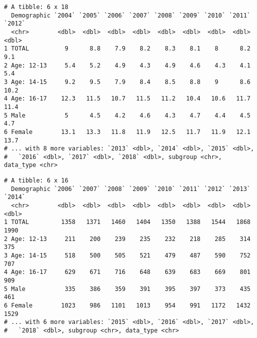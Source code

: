 \documentclass[
]{article}
\newenvironment{Shaded}{\begin{snugshade}}{\end{snugshade}}
\newcommand{\DataTypeTok}[1]{\textcolor[rgb]{0.13,0.29,0.53}{#1}}
\newcommand{\FloatTok}[1]{\textcolor[rgb]{0.00,0.00,0.81}{#1}}
\newcommand{\KeywordTok}[1]{\textcolor[rgb]{0.13,0.29,0.53}{\textbf{#1}}}
\newcommand{\NormalTok}[1]{#1}
\newcommand{\OperatorTok}[1]{\textcolor[rgb]{0.81,0.36,0.00}{\textbf{#1}}}
\newcommand{\StringTok}[1]{\textcolor[rgb]{0.31,0.60,0.02}{#1}}
\begin{document}
\begin{Shaded}
\end{Shaded}

\begin{verbatim}
# A tibble: 6 x 18
  Demographic `2004` `2005` `2006` `2007` `2008` `2009` `2010` `2011` `2012`
  <chr>        <dbl>  <dbl>  <dbl>  <dbl>  <dbl>  <dbl>  <dbl>  <dbl>  <dbl>
1 TOTAL          9      8.8    7.9    8.2    8.3    8.1    8      8.2    9.1
2 Age: 12-13     5.4    5.2    4.9    4.3    4.9    4.6    4.3    4.1    5.4
3 Age: 14-15     9.2    9.5    7.9    8.4    8.5    8.8    9      8.6   10.2
4 Age: 16-17    12.3   11.5   10.7   11.5   11.2   10.4   10.6   11.7   11.4
5 Male           5      4.5    4.2    4.6    4.3    4.7    4.4    4.5    4.7
6 Female        13.1   13.3   11.8   11.9   12.5   11.7   11.9   12.1   13.7
# ... with 8 more variables: `2013` <dbl>, `2014` <dbl>, `2015` <dbl>,
#   `2016` <dbl>, `2017` <dbl>, `2018` <dbl>, subgroup <chr>, data_type <chr>
\end{verbatim}

\begin{Shaded}
\end{Shaded}

\begin{verbatim}
# A tibble: 6 x 16
  Demographic `2006` `2007` `2008` `2009` `2010` `2011` `2012` `2013` `2014`
  <chr>        <dbl>  <dbl>  <dbl>  <dbl>  <dbl>  <dbl>  <dbl>  <dbl>  <dbl>
1 TOTAL         1358   1371   1460   1404   1350   1388   1544   1868   1990
2 Age: 12-13     211    200    239    235    232    218    285    314    375
3 Age: 14-15     518    500    505    521    479    487    590    752    707
4 Age: 16-17     629    671    716    648    639    683    669    801    909
5 Male           335    386    359    391    395    397    373    435    461
6 Female        1023    986   1101   1013    954    991   1172   1432   1529
# ... with 6 more variables: `2015` <dbl>, `2016` <dbl>, `2017` <dbl>,
#   `2018` <dbl>, subgroup <chr>, data_type <chr>
\end{verbatim}
\end{document}
